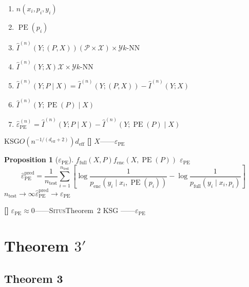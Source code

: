 \documentclass[11pt,a4paper]{article}
\newtheorem{proposition}[theorem]{Proposition}
\theoremstyle{remark}
\DeclareMathOperator{\PE}{PE}
\newcommand{\Y}{\mathcal{Y}}
\newcommand{\X}{\mathcal{X}}
\newcommand{\Ppos}{\mathcal{P}}
\newcommand{\Situs}{\textsc{Situs}}
\newcommand{\heuristic}{\textnormal{\textbf{[]}}}
\begin{document}
\textbf{}
\begin{enumerate}[label=(\arabic*)]
    \item $n$$(x_i, p_i, y_i)$
    \item $\PE(p_i)$
    \item $\hat{I}^{(n)}(Y; (P, X))$$(\Ppos \times \X) \times \Y$$k$-NN
    \item $\hat{I}^{(n)}(Y; X)$$\X \times \Y$$k$-NN
    \item $\hat{I}^{(n)}(Y; P \mid X) = \hat{I}^{(n)}(Y; (P, X)) - \hat{I}^{(n)}(Y; X)$
    \item $\hat{I}^{(n)}(Y; \PE(P) \mid X)$
    \item $\hat{\varepsilon}_{\PE}^{(n)} = \hat{I}^{(n)}(Y; P \mid X) - \hat{I}^{(n)}(Y; \PE(P) \mid X)$
\end{enumerate}

\textbf{}KSG$O(n^{-1/(d_{\text{eff}}+2)})$$d_{\text{eff}}$
\heuristic{} $X$——$\varepsilon_{\PE}$
\textbf{}

\begin{proposition}[$\varepsilon_{\PE}$]
\label{prop:3.3.1}
$f_{\text{full}}$$(X, P)$$f_{\text{enc}}$$(X, \PE(P))$
\textbf{}$\varepsilon_{\PE}$
\begin{equation}
    \boxed{
    \hat{\varepsilon}_{\PE}^{\text{pred}} = \frac{1}{n_{\text{test}}}
    \sum_{i=1}^{n_{\text{test}}}
    \left[\log\frac{1}{p_{\text{enc}}(y_i \mid x_i, \PE(p_i))}
        - \log\frac{1}{p_{\text{full}}(y_i \mid x_i, p_i)}\right]
    }
\end{equation}
$n_{\text{test}} \to \infty$$\hat{\varepsilon}_{\PE}^{\text{pred}} \to \varepsilon_{\PE}$
\end{proposition}

\heuristic{} \textbf{}\textbf{}
$\varepsilon_{\PE} \approx 0$——\Situs{}Theorem~2
KSG
——$\varepsilon_{\PE}$

\section{Theorem $3'$}

\subsection{Theorem 3}
\end{document}

